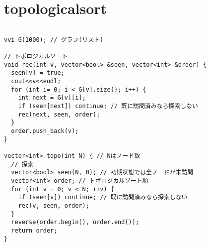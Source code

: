 \documentclass[a4j,titlepage]{jarticle} %
\begin{document}
\section{topologicalsort}
\color{black}
\begin{lstlisting}[caption=topologicalsort]

vvi G(1000); // グラフ(リスト)

// トポロジカルソート
void rec(int v, vector<bool> &seen, vector<int> &order) {
  seen[v] = true;
  cout<<v<<endl;
  for (int i= 0; i < G[v].size(); i++) {
    int next = G[v][i];
    if (seen[next]) continue; // 既に訪問済みなら探索しない
    rec(next, seen, order);
  }
  order.push_back(v);
}

vector<int> topo(int N) { // Nはノード数
  // 探索
  vector<bool> seen(N, 0); // 初期状態では全ノードが未訪問
  vector<int> order; // トポロジカルソート順
  for (int v = 0; v < N; ++v) {
    if (seen[v]) continue; // 既に訪問済みなら探索しない
    rec(v, seen, order);
  }
  reverse(order.begin(), order.end());
  return order;
}

\end{lstlisting}

\color{white}
\end{document}
